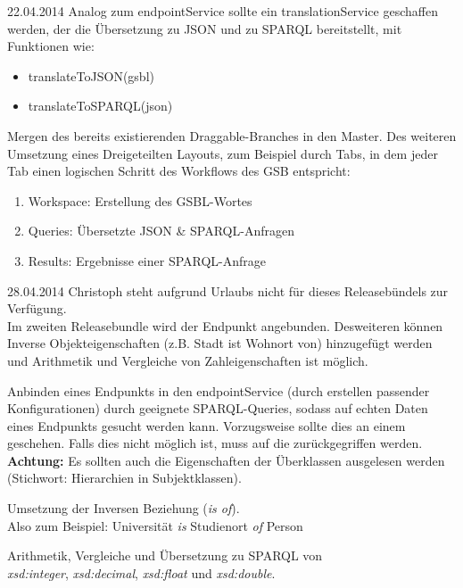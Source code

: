 \begin{release}{22.04.2014}
%
Analog zum endpointService sollte ein translationService geschaffen werden, der die Übersetzung zu JSON und zu SPARQL bereitstellt, mit Funktionen wie:
\begin{itemize}
\item translateToJSON(gsbl)
\item translateToSPARQL(json)
\end{itemize}

%
Mergen des bereits existierenden Draggable-Branches in den Master. Des weiteren Umsetzung eines Dreigeteilten Layouts, zum Beispiel durch Tabs, in dem jeder Tab einen logischen Schritt des Workflows des GSB entspricht:
\begin{enumerate}
\item Workspace: Erstellung des GSBL-Wortes
\item Queries: Übersetzte JSON \& SPARQL-Anfragen
\item Results: Ergebnisse einer SPARQL-Anfrage
\end{enumerate}
\end{release}


\begin{release}{28.04.2014}
Christoph steht aufgrund Urlaubs nicht für dieses Releasebündels zur Verfügung.\\
Im zweiten Releasebundle wird der Endpunkt angebunden. Desweiteren können Inverse Objekteigenschaften (z.B. \glqq Stadt ist Wohnort von\grqq) hinzugefügt werden und Arithmetik und Vergleiche von Zahleigenschaften ist möglich.

%
Anbinden eines Endpunkts in den endpointService (durch erstellen passender Konfigurationen) durch geeignete SPARQL-Queries, sodass auf echten Daten eines Endpunkts gesucht werden kann. Vorzugsweise sollte dies an einem   geschehen. Falls dies nicht möglich ist, muss auf die  zurückgegriffen werden.\\
\textbf{Achtung:} Es sollten auch die Eigenschaften der Überklassen ausgelesen werden (Stichwort: Hierarchien in Subjektklassen).

%
Umsetzung der Inversen Beziehung (\textit{is of}).\\
Also zum Beispiel: \glqq Universität \textit{is} Studienort \textit{of} Person\grqq

%
Arithmetik, Vergleiche und Übersetzung zu SPARQL von\\
\textit{xsd:integer}, \textit{xsd:decimal}, \textit{xsd:float} und \textit{xsd:double}.


\end{release}


